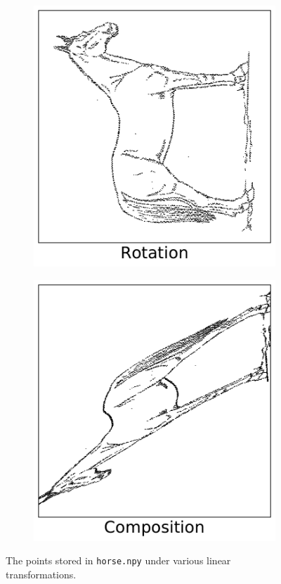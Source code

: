 \begin{figure}[H]
\begin{subfigure}{.32\textwidth}
\end{subfigure}
%
\begin{subfigure}{.32\textwidth}
    \centering
    \includegraphics[width=\linewidth]{figures/RotationHorse.pdf}
\end{subfigure}
%
\begin{subfigure}{.32\textwidth}
    \centering
    \includegraphics[width=\linewidth]{figures/CompositionHorse.pdf}
\end{subfigure}
\caption{The points stored in \texttt{horse.npy} under various linear transformations.}
\label{fig:linearly-transformed-horses}
\end{figure}


